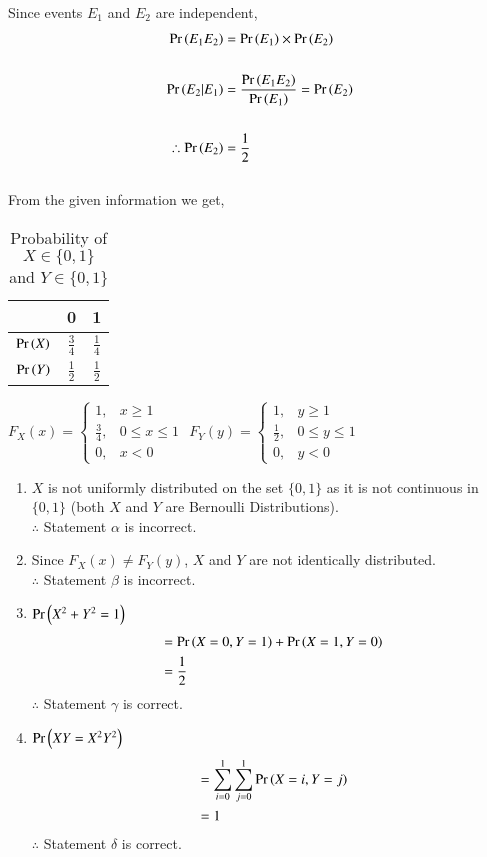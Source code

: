 %
Since events $E_1$ and $E_2$ are independent, 
\begin{align}
    \Pr\left(E_1E_2\right)&=\Pr\left(E_1\right)\times\Pr\left(E_2\right) \nonumber\\\nonumber\\
    \Pr\left(E_2|E_1\right)&=\frac{\Pr\left(E_1E_2\right)}{\Pr\left(E_1\right)} = \Pr\left(E_2\right) \nonumber\\ \nonumber\\
     \therefore \Pr\left(E_2\right) &= \frac{1}{2}
\end{align}
\\[1000pt]
From the given information we get,\\
\begin{table}[h]
\centering
    \begin{tabular}{|c|c|c|}
        \hline
         &0 &1    \\ \hline
        $\Pr\left(X\right)$ &$\frac{3}{4}$ &$\frac{1}{4}$   \\ \hline
        $\Pr\left(Y\right)$ &$\frac{1}{2}$ &$\frac{1}{2}$ \\ \hline
    \end{tabular}
\caption{Probability of $X \in \{0,1\}$ and $Y \in \{0,1\}$}
\label{ma2003-80:table=1}
\end{table}
%
$F_X(x)=
\begin{cases}
1, &x\geq1\\
\frac{3}{4}, & 0\leq x \leq1\\
0, &x<0
\end{cases}$
$F_Y(y)=
\begin{cases}
1, &y\geq1\\
\frac{1}{2}, & 0\leq y \leq1\\
0, &y<0
\end{cases}$
\\
\begin{enumerate}[label=(\arabic*)]
    \item $X$ is not uniformly distributed on the set $\{0,1\}$ as it is not continuous in $\{0,1\}$ (both $X$ and $Y$ are Bernoulli Distributions).\\
    $\therefore$ Statement $\alpha$ is incorrect.\label{ma2003-80:a}\\ 
    \item Since $F_X(x)\neq F_Y(y)$, $X$ and $Y$ are not identically distributed.\\
    $\therefore$ Statement $\beta$ is incorrect.\label{ma2003-80:b}\\
    \item $\Pr\left(X^2+Y^2=1\right)$\label{ma2003-80:c}
    \begin{align}
        &=\Pr\left(X=0,Y=1\right)+\Pr\left(X=1,Y=0\right)\nonumber\\
        &= \frac{1}{2}
    \end{align}
    $\therefore$ Statement $\gamma$ is correct.\\
    \item $\Pr\left(XY=X^2Y^2\right)$\label{ma2003-80:d}
    \begin{align}
        &=\sum_{i=0}^1\sum_{j=0}^1\Pr\left(X=i,Y=j\right)\nonumber\\
        &= 1
    \end{align}
    $\therefore$ Statement $\delta$ is correct.\\
\end{enumerate}
